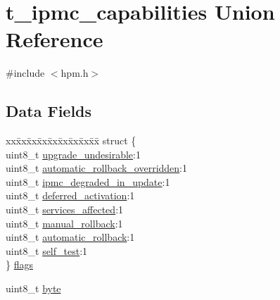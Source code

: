 \hypertarget{uniont__ipmc__capabilities}{\section{t\-\_\-ipmc\-\_\-capabilities Union Reference}
\label{uniont__ipmc__capabilities}
}


{\ttfamily \#include $<$hpm.\-h$>$}

\subsection*{Data Fields}
\begin{DoxyCompactItemize}
\item 
\begin{tabbing}
xx\=xx\=xx\=xx\=xx\=xx\=xx\=xx\=xx\=\kill
struct \{\\
\>uint8\_t \hyperlink{uniont__ipmc__capabilities_aaffb694baa0cba6b396e8a59bb82c4a6}{upgrade\_undesirable}:1\\
\>uint8\_t \hyperlink{uniont__ipmc__capabilities_a314b2e1d383b8a362585bb7a74b448fd}{automatic\_rollback\_overridden}:1\\
\>uint8\_t \hyperlink{uniont__ipmc__capabilities_ad21ab0c6e5e89ff1dbc82f2f8019d602}{ipmc\_degraded\_in\_update}:1\\
\>uint8\_t \hyperlink{uniont__ipmc__capabilities_aeb8b4f846e6fe23a0da8f6733581ff7f}{deferred\_activation}:1\\
\>uint8\_t \hyperlink{uniont__ipmc__capabilities_af022ead658150c3cb0af1d8d1cc52a4f}{services\_affected}:1\\
\>uint8\_t \hyperlink{uniont__ipmc__capabilities_ad48b4bc3108384a38e1d9403fe301fea}{manual\_rollback}:1\\
\>uint8\_t \hyperlink{uniont__ipmc__capabilities_a1a45b4b1a3f39a7cbb276c30d9b1f696}{automatic\_rollback}:1\\
\>uint8\_t \hyperlink{uniont__ipmc__capabilities_a97242695765ddcdb57ac9d42f8dbc6eb}{self\_test}:1\\
\} \hyperlink{uniont__ipmc__capabilities_a938bbbfe63d8e51fc045ec64e52e1c90}{flags}\\

\end{tabbing}\item 
uint8\-\_\-t \hyperlink{uniont__ipmc__capabilities_a235c019c9d960f72a9b21610333a13e8}{byte}
\end{DoxyCompactItemize}


